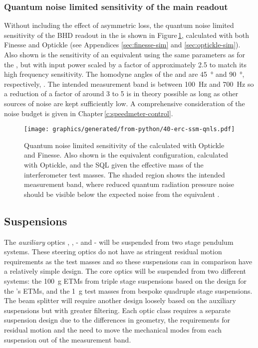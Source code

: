 \subsubsection{Quantum noise limited sensitivity of the main readout}
Without including the effect of asymmetric loss, the quantum noise limited sensitivity of the \gls{BHD} readout in the \SSMEXPT{} is shown in Figure\,\ref{fig:erc-ssm-qnls}, calculated with both Finesse and Optickle (see Appendices \ref{sec:finesse-sim} and \ref{sec:optickle-sim}). Also shown is the sensitivity of an equivalent \MI{} using the same parameters as for the \SSM{}, but with input power scaled by a factor of approximately \num{2.5} to match its high frequency sensitivity. The homodyne angles of the \SSM{} and \MI{} are \SI{45}{\degree} and \SI{90}{\degree}, respectively, . The intended measurement band is between \SI{100}{\hertz} and \SI{700}{\hertz} so a reduction of a factor of around \num{3} to \num{5} is in theory possible as long as other sources of noise are kept sufficiently low. A comprehensive consideration of the noise budget is given in Chapter\,\ref{c:speedmeter-control}.

\begin{figure}
  \centering
  \texttt{[image: graphics/generated/from-python/40-erc-ssm-qnls.pdf]}
  \caption[Quantum noise limited sensitivity of the \SSMEXPT{}]{\label{fig:erc-ssm-qnls}Quantum noise limited sensitivity of the \SSMEXPT{} calculated with Optickle and Finesse. Also shown is the equivalent \MI{} configuration, calculated with Optickle, and the \gls{SQL} given the effective mass of the interferometer test masses. The shaded  region shows the intended measurement band, where reduced quantum radiation pressure noise should be visible below the expected noise from the equivalent \MI{}.}
\end{figure}

\subsection{Suspensions}
The \emph{auxiliary} optics \MFOUR{}, \MFIVE{}, \MSEVEN{}-\MTEN{} and \MTWELVE{}-\MFIFTEEN{} will be suspended from two stage pendulum systems. These steering optics do not have as stringent residual motion requirements as the test masses and so these suspensions can in comparison have a relatively simple design. The core optics will be suspended from two different systems: the \SI{100}{\gram} \glspl{ETM} from triple stage suspensions based on the design for the \AEIPROTOTYPE{}'s \glspl{ETM}, and the \SI{1}{\gram} test masses from bespoke quadruple stage suspensions. The beam splitter \MSIX{} will require another design loosely based on the auxiliary suspensions but with greater filtering. Each optic class requires a separate suspension design due to the differences in geometry, the requirements for residual motion and the need to move the mechanical modes from each suspension out of the measurement band.

